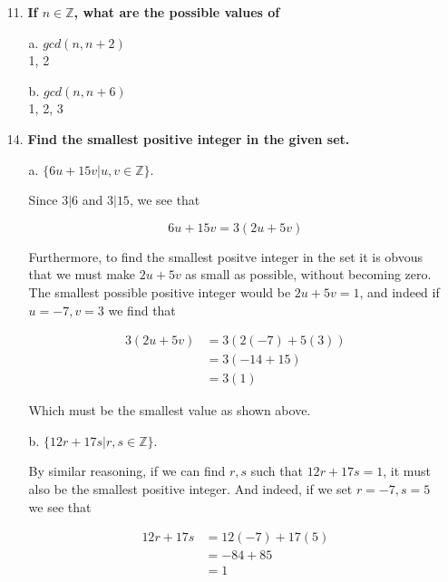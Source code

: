 \documentclass{article}
\begin{document}
\begin{enumerate}
		\item[11.]	\textbf{If $n \in \mathbb{Z}$, what are the possible values of} 
		\begin{enumerate}
			\item[a.]	$gcd(n, n+2)$ \\
				1, 2
			\item[b.]	$gcd(n, n+6)$ \\
				1, 2, 3
		\end{enumerate}

		\item[14.]	\textbf{Find the smallest positive integer in the given set.}
		\begin{enumerate}
			\item[a.]	$\lbrace 6u + 15v \vert u, v \in \mathbb{Z} \rbrace$. 

				Since $3 | 6$ and $3 | 15$, we see that
				
				\begin{equation*}
					6u + 15v = 3(2u + 5v)
				\end{equation*}

				Furthermore, to find the smallest positve integer in the set it is obvous that we 
				must make $2u + 5v$ as small as possible, without becoming zero. The smallest 
				possible positive integer would be $2u + 5v = 1$, and indeed if $u = -7, v = 3$ we
				find that

				\begin{align*}
					3(2u + 5v) &= 3(2(-7) + 5(3)) \\
							   &= 3(-14 + 15) \\
							   &= 3(1) 
				\end{align*}

				Which must be the smallest value as shown above.

			\item[b.]	$\lbrace 12r + 17s \vert r, s \in \mathbb{Z} \rbrace$. 

				By similar reasoning, if we can find $r, s$ such that $12r + 17s = 1$, it must also 
				be the smallest positive integer. And indeed, if we set $r = -7, s = 5$ we see that

				\begin{align*}
					12r + 17s &= 12(-7) + 17(5) \\
							  &= -84 + 85 \\
							  &= 1
				\end{align*}


\end{enumerate}
\end{enumerate}
\end{document}
